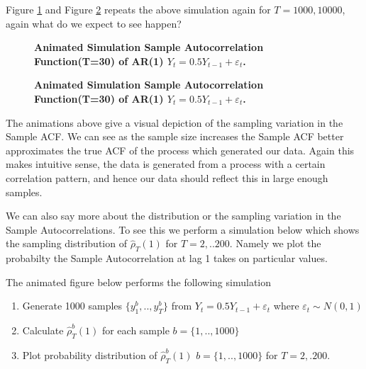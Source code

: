 \documentclass[openany]{tufte-book} %
\begin{document}
 Figure \ref{ar3}  and Figure \ref{ar4} repeats the above simulation again for  $T=1000,10000$, again what do we expect to see happen?  
 

\begin{figure} \label{ar3}
	\caption[Animated Simulation Sample Autocorrelation Function (T=30) of AR(1)  ]{\textbf{Animated Simulation Sample Autocorrelation Function(T=30) of AR(1) $Y_t=0.5Y_{t-1} +\varepsilon_t$. }}
	\end{figure}


\begin{figure}\label{ar4}
	\caption[Animated Simulation Sample Autocorrelation Function (T=10000) of AR(1)  ]{\textbf{Animated Simulation Sample Autocorrelation Function(T=30) of AR(1) $Y_t=0.5Y_{t-1} +\varepsilon_t$. }}
	
\end{figure}
\newpage
The animations above give a visual depiction of the sampling variation in the Sample ACF. We can see as the sample size increases the Sample ACF better approximates the true ACF of the process which generated our data. Again this makes intuitive sense, the data is generated from a process with a certain correlation pattern, and hence our data should reflect this in large enough samples. 

We can also say more about the distribution or the sampling variation in the Sample Autocorrelations. To see this we perform a simulation below which shows the sampling distribution of $\hat{\rho}_T(1)$ for $T=2,..200$. Namely we plot the probabilty the Sample Autocorrelation at lag 1 takes on particular values. \newline \vspace{0.5cm}

The animated figure below performs the following simulation

\begin{enumerate}	
	\item Generate 1000 samples $\{y_1^b,..,y_T^b\}$ from $Y_t=0.5Y_{t-1} +\varepsilon_t$ where $\varepsilon_t \sim N(0,1)$

	\item Calculate $\hat{\rho}_{T}^b(1)$	for each sample $b=\{1,..,1000\}$  
	

	
	\item	Plot probability distribution of   $\hat{\rho}_{T}^b(1)$  $b=\{1,..,1000\}$  for $T=2,.200$.
	
\end{enumerate}
\end{document}
